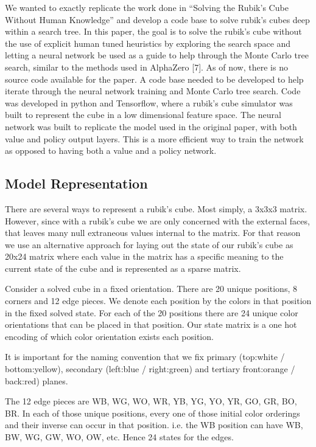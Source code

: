 \documentclass[10pt,twocolumn,letterpaper]{article}
\begin{document}
We wanted to exactly replicate the work done in “Solving the Rubik’s Cube Without Human Knowledge” and develop a code base to solve rubik's cubes deep within a search tree. In this paper, the goal is to solve the rubik's cube without the use of explicit human tuned heuristics by exploring the search space and letting a neural network be used as a guide to help through the Monte Carlo tree search, similar to the methods used in AlphaZero [7]. As of now, there is no source code available for the paper. A code base needed to be developed to help iterate through the neural network training and Monte Carlo tree search. Code was developed in python and Tensorflow, where a rubik's cube simulator was built to represent the cube in a low dimensional feature space. The neural network was built to replicate the model used in the original paper, with both value and policy output layers. This is a more efficient way to train the network as opposed to having both a value and a policy network.

\subsection{Model Representation}
There are several ways to represent a rubik's cube.  Most simply, a 3x3x3 matrix.  However, since with a rubik's cube we are only concerned with the external faces, that leaves many null extraneous values internal to the matrix.   For that reason we use an alternative approach for laying out the state of our rubik's cube as 20x24 matrix where each value in the matrix has a specific meaning to the current state of the cube and is represented as a sparse matrix.

Consider a solved cube in a fixed orientation.  There are 20 unique positions, 8 corners and 12 edge pieces.  We denote each position by the colors in that position in the fixed solved state.  For each of the 20 positions there are 24 unique color orientations that can be placed in that position.  Our state matrix is a one hot encoding of which color orientation exists each position. 

It is important for the naming convention that we fix primary (top:white / bottom:yellow), secondary (left:blue / right:green) and tertiary front:orange / back:red) planes.  

The 12 edge pieces are WB, WG, WO, WR, YB, YG, YO, YR, GO, GR, BO, BR.  In each of those unique positions, every one of those initial color orderings and their inverse can occur in that position.  i.e. the WB position can have WB, BW, WG, GW, WO, OW, etc.  Hence 24 states for the edges.  
\end{document}
